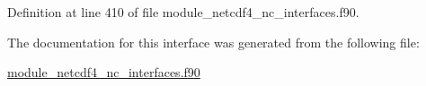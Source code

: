 Definition at line 410 of file module\+\_\+netcdf4\+\_\+nc\+\_\+interfaces.\+f90.



The documentation for this interface was generated from the following file\+:\begin{DoxyCompactItemize}
\item 
\hyperlink{module__netcdf4__nc__interfaces_8f90}{module\+\_\+netcdf4\+\_\+nc\+\_\+interfaces.\+f90}\end{DoxyCompactItemize}
